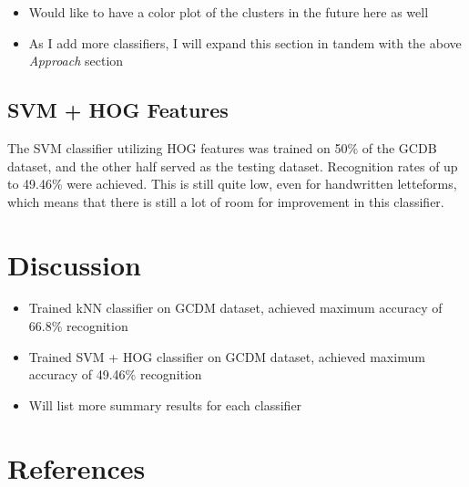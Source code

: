 \documentclass[10pt,twocolumn,letterpaper]{article}
\begin{document}
\begin{itemize}
    \item Would like to have a color plot of the clusters in the future here as well
    \item As I add more classifiers, I will expand this section in tandem with the above \textit{Approach} section
\end{itemize}

\subsection{SVM + HOG Features}
The SVM classifier utilizing HOG features was trained on 50\% of the GCDB dataset, and the other half served as the testing dataset. Recognition rates of up to 49.46\% were achieved. This is still quite low, even for handwritten letteforms, which means that there is still a lot of room for improvement in this classifier.

\section{Discussion}

\begin{itemize}
    \item Trained kNN classifier on GCDM dataset, achieved maximum accuracy of 66.8\% recognition
    \item Trained SVM + HOG classifier on GCDM dataset, achieved maximum accuracy of 49.46\% recognition
    \item Will list more summary results for each classifier
\end{itemize}

\section{References}

{\small


}
\end{document}
